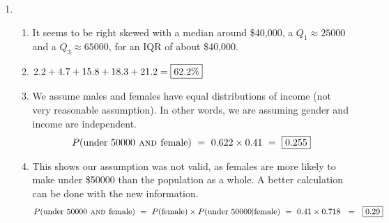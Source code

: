 \documentclass[12pt,letterpaper]{article}
\begin{document}
\begin{enumerate}
\item \begin{enumerate}
\item It seems to be right skewed with a median around \$40,000, a $Q_1 \approx 25000$ and a $Q_3 \approx 65000$, for an IQR of about \$40,000.
\item $2.2+4.7+15.8+18.3+21.2 = \fbox{62.2\%}$
\item We assume males and females have equal distributions of income (not very reasonable assumption). In other words, we are assuming gender and income are independent.
$$P(\text{under 50000} \textsc{~and~} \text{female}) ~=~ 0.622 \times 0.41 ~=~ \fbox{0.255} $$
\item This shows our assumption was not valid, as females are more likely to make under \$50000 than the population as a whole. A better calculation can be done with the new information.
$$P(\text{under 50000} \textsc{~and~} \text{female}) ~=~ P(\text{female})\times P(\text{under 50000}| \text{female}) ~=~ 0.41 \times 0.718 ~~=~~\fbox{0.29} $$
\end{enumerate}

\end{enumerate}
\end{document}

